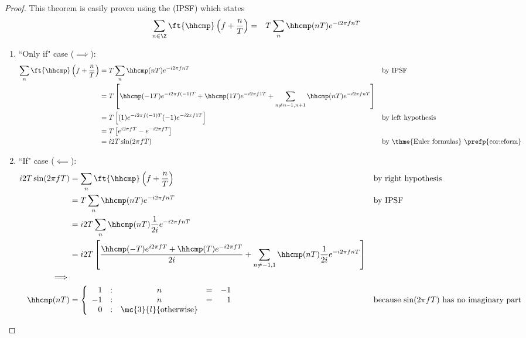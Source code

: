 \begin{proof}
This theorem is easily proven using the
 (IPSF) 
which states
\begin{eqnarray*}
   \sum_{n\in\Z} \ft{\hhcmp}\left( f+ \frac{n}{T} \right)
      &=& T \sum_n \hhcmp(nT) e^{-i2\pi fnT}
\end{eqnarray*}

\begin{enumerate}
  \item ``Only if" case ($\implies$):
\begin{align*}
   \sum_n \ft{\hhcmp}\left( f + \frac{n}{T} \right)
       &= T\sum_n \hhcmp(nT) e^{-i2\pi fnT}
       && \text{by IPSF}
     \\&= T\left[
                  \hhcmp(-1T) e^{-i2\pi f(-1)T} +
                  \hhcmp(1T) e^{-i2\pi f1T} +
                  \sum_{n\ne n-1,n+1} \hhcmp(nT) e^{-i2\pi fnT}
               \right]
     \\&= T\left[
                  (1)  e^{-i2\pi f(-1)T}
                  (-1) e^{-i2\pi f1T}
               \right]
       && \text{by left hypothesis}
     \\&= T\left[e^{i2\pi fT} -e^{-i2\pi fT} \right]
     \\&= i2T \sin( 2\pi fT )
       && \text{by \thme{Euler formulas} \prefp{cor:eform}}
\end{align*}

\item ``If" case ($\impliedby$):
\begin{align*}
   i2T \sin( 2\pi fT )
       &= \sum_n \ft{\hhcmp}\left( f+\frac{n}{T} \right)
       && \text{by right hypothesis}
     \\&= T \sum_n \hhcmp(nT) e^{-i2\pi fnT}
       && \text{by IPSF}
     \\&= i2T \sum_n \hhcmp(nT) \frac{1}{2i}e^{-i2\pi fnT}
     \\&= i2T \left[
                 \frac{\hhcmp(-T)e^{i2\pi fT} + \hhcmp( T)e^{-i2\pi fT}}
                      {2i}
                 + \sum_{n\ne-1,1} \hhcmp(nT) \frac{1}{2i}e^{-i2\pi fnT}
              \right]
     \\ \implies
\\
   \hhcmp(nT)
   &= \left\{
      \begin{array}{rcccr}
          1 & : & n &=&   -1 \\
         -1 & : & n &=&    1 \\
          0 & : & \mc{3}{l}{\mbox{otherwise}}
      \end{array} \right.
       && \text{because $\sin(2\pi fT)$ has no imaginary part}
\end{align*}
\end{enumerate}
\end{proof}

